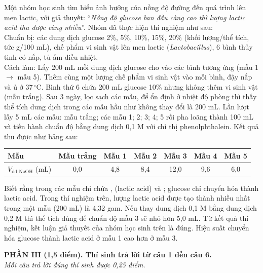 \documentclass[11pt,a4paper]{article}
\begin{document}
\begin{ex}
Một nhóm học sinh tìm hiểu ảnh hưởng của nồng độ đường đến quá trình lên men lactic, với giả thuyết: ``\textit{Nồng độ glucose ban đầu càng cao thì lượng lactic acid thu được càng nhiều}''. Nhóm đã thực hiện thí nghiệm như sau:\\
Chuẩn bị: các dung dịch glucose 2\%, 5\%, 10\%, 15\%, 20\% (khối lượng/thể tích, tức g/100 mL), chế phẩm vi sinh vật lên men lactic (\textit{Lactobacillus}), 6 bình thủy tinh có nắp, tủ ấm điều nhiệt.\\
Cách làm: Lấy 200 mL mỗi dung dịch glucose cho vào các bình tương ứng (mẫu 1 $\longrightarrow$ mẫu 5). Thêm cùng một lượng chế phẩm vi sinh vật vào mỗi bình, đậy nắp và ủ ở $37\,^\circ\text{C}$. Bình thứ 6 chứa 200 mL glucose 10\% nhưng không thêm vi sinh vật (mẫu trắng). Sau 3 ngày, lọc sạch các mẫu, để ổn định ở nhiệt độ phòng thì thấy thể tích dung dịch trong các mẫu hầu như không thay đổi là 200 mL. Lần lượt lấy 5 mL các mẫu: mẫu trắng; các mẫu 1; 2; 3; 4; 5 rồi pha loãng thành 100 mL và tiến hành chuẩn độ bằng dung dịch  0,1 M với chỉ thị phenolphthalein. Kết quả thu được như bảng sau:
\begin{center}
\begin{tabular}{|l|c|c|c|c|c|c|}
\hline
\textbf{Mẫu} & \textbf{Mẫu trắng} & \textbf{Mẫu 1} & \textbf{Mẫu 2} & \textbf{Mẫu 3} & \textbf{Mẫu 4} & \textbf{Mẫu 5} \\
\hline
$V_{\text{dd NaOH}}$ (mL) & 0,0 & 4,8 & 8,4 & 12,0 & 9,6 & 6,0 \\
\hline
\end{tabular}
\end{center}
Biết rằng trong các mẫu chỉ chứa ,  (lactic acid) và ; glucose chỉ chuyển hóa thành lactic acid.
\choiceTF
{\True Trong thí nghiệm trên, lượng lactic acid được tạo thành nhiều nhất trong một mẫu (200 mL) là 4,32 gam.}
{Nếu thay dung dịch  0,1 M bằng dung dịch  0,2 M thì thể tích  dùng để chuẩn độ mẫu 3 sẽ nhỏ hơn 5,0 mL.}
{Từ kết quả thí nghiệm, kết luận giả thuyết của nhóm học sinh trên là đúng.}
{\True Hiệu suất chuyển hóa glucose thành lactic acid ở mẫu 1 cao hơn ở mẫu 3.}

\end{ex}


\vspace{5pt}
\noindent
\textbf{\color{mainGreen}PHẦN III (1,5 điểm). Thí sinh trả lời từ câu 1 đến câu 6.}\\
\textit{Mỗi câu trả lời đúng thí sinh được 0,25 điểm.}
\end{document}
